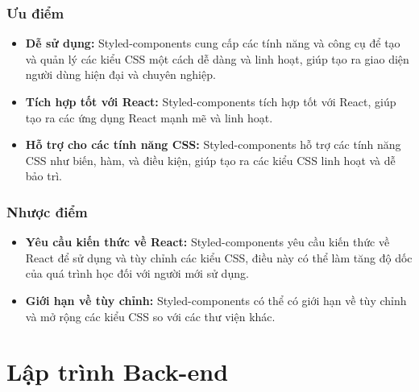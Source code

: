 \subsubsection{Ưu điểm}
\begin{itemize}
  \item \textbf{Dễ sử dụng:} Styled-components cung cấp các tính năng và công cụ để tạo và quản lý các kiểu CSS một cách dễ dàng và linh hoạt, giúp tạo ra giao diện người dùng hiện đại và chuyên nghiệp.
  \item \textbf{Tích hợp tốt với React:} Styled-components tích hợp tốt với React, giúp tạo ra các ứng dụng React mạnh mẽ và linh hoạt.
  \item \textbf{Hỗ trợ cho các tính năng CSS:} Styled-components hỗ trợ các tính năng CSS như biến, hàm, và điều kiện, giúp tạo ra các kiểu CSS linh hoạt và dễ bảo trì.
\end{itemize}
\subsubsection{Nhược điểm}
\begin{itemize}
  \item \textbf{Yêu cầu kiến thức về React:} Styled-components yêu cầu kiến thức về React để sử dụng và tùy chỉnh các kiểu CSS, điều này có thể làm tăng độ dốc của quá trình học đối với người mới sử dụng.
  \item \textbf{Giới hạn về tùy chỉnh:} Styled-components có thể có giới hạn về tùy chỉnh và mở rộng các kiểu CSS so với các thư viện khác.
\end{itemize}
\section{Lập trình Back-end}
